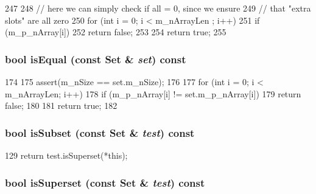 \begin{DoxyCode}
247 {
248     // here we can simply check if all = 0, since we ensure
249     // that "extra slots" are all zero
250     for (int i = 0; i < m_nArrayLen ; i++)
251         if (m_p_nArray[i])
252             return false;
253 
254     return true;
255 }
\end{DoxyCode}
\hypertarget{classSet_ad6a92fc7477f163a8730441d3597f5e1}{
\subsubsection[{isEqual}]{\setlength{\rightskip}{0pt plus 5cm}bool isEqual (const {\bf Set} \& {\em set}) const}}
\label{classSet_ad6a92fc7477f163a8730441d3597f5e1}



\begin{DoxyCode}
174 {
175     assert(m_nSize == set.m_nSize);
176 
177     for (int i = 0; i < m_nArrayLen; i++)
178         if (m_p_nArray[i] != set.m_p_nArray[i])
179             return false;
180 
181     return true;
182 }
\end{DoxyCode}
\hypertarget{classSet_a103a25450363d9ffaf73f74e3690be62}{
\subsubsection[{isSubset}]{\setlength{\rightskip}{0pt plus 5cm}bool isSubset (const {\bf Set} \& {\em test}) const}}
\label{classSet_a103a25450363d9ffaf73f74e3690be62}



\begin{DoxyCode}
129 { return test.isSuperset(*this); }
\end{DoxyCode}
\hypertarget{classSet_afa8a7c09df1409cc3cbf2c0a8a9758c9}{
\subsubsection[{isSuperset}]{\setlength{\rightskip}{0pt plus 5cm}bool isSuperset (const {\bf Set} \& {\em test}) const}}
\label{classSet_afa8a7c09df1409cc3cbf2c0a8a9758c9}



